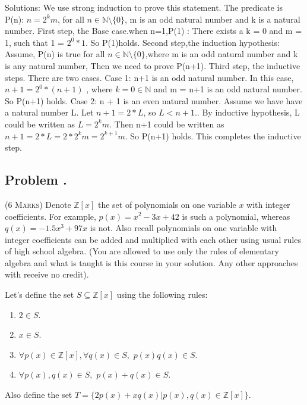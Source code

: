 \documentclass[12pt]{article}
\newcounter{ProblemNum}
\renewcommand{\theProblemNum}{\arabic{ProblemNum}}
\newcommand*{\anyproblem}[1]{\newpage\subsection*{#1}}
\newcommand*{\problem}[1]{\stepcounter{ProblemNum} %
\anyproblem{Problem \theProblemNum. \; #1}}
\begin{document}
Solutions: 
    We use strong induction to prove this statement.\vskip5pt
    The predicate is P(n): $n = 2^km$, for all $n\in\mathbb{N}\setminus\{0\}$, m is an odd natural number and k is a natural number.\vskip5pt
    First step, the Base case.when n=1,P(1) : There exists a k = 0 and m = 1, such that 1 = $2^0*1$. So P(1)holds. \vskip5pt
    Second step,the induction hypothesis: Assume, P(n) is true for all
    $n\in\mathbb{N}\setminus\{0\}$,where m is an odd natural number and k is any natural number,  Then we need to prove P(n+1).\vskip5pt
    Third step, the inductive steps. There are two cases.\vskip5pt
    Case 1: n+1 is an odd natural number. In this case, $n+1 = 2^0 * (n+1)$ , where $k = 0\in\mathbb{N}$ and m = n+1 is an odd natural number. So P(n+1) holds.\vskip5pt
    Case 2: n + 1 is an even natural number. Assume we have have a natural number L. Let $n+1 = 2 * L$, so $L < n +1.$. By inductive hypothesis, L could be written as $L = 2^km$. Then n+1 could be written as $n+1 = 2*L = 2*2^km = 2^{k+1}m $. So P(n+1) holds. This completes the inductive step. 
    
     

\problem{}
\textsc{(6 Marks)}  Denote $\mathbb{Z}[x]$ the set of polynomials on one variable $x$ with integer coefficients.
For example, $p(x)=x^2-3x+42$ is such a polynomial, whereas $q(x)=-1.5x^3+97x$ is not. Also recall polynomials on one variable with integer coefficients can be added and multiplied with each other using usual rules of high school algebra. (You are allowed to use only the rules of elementary algebra and what is taught is this course in your solution. Any other approaches with receive no credit).

\vskip5pt
Let's define the set $S\subseteq \mathbb{Z}[x]$ using the following rules:


\begin{enumerate}
\item $2\in S$.
\item $x\in S$.
\item $\forall p(x)\in\mathbb{Z}[x], \forall q(x)\in S,\,\, p(x)q(x)\in S$.
\item $\forall p(x),q(x) \in S,\,\, p(x)+q(x)\in S$.
\end{enumerate}

\vskip5pt

Also define the set $T=\{2p(x)+xq(x)|p(x),q(x)\in\mathbb{Z}[x]\}$.

\vskip5pt
\end{document}
